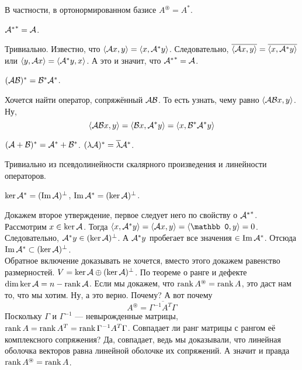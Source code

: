 \documentclass{article}
\DeclareMathOperator{\operIm}{Im}
\let\Im\operIm
\begin{document}
\begin{itemize}
\begin{Comment}
            В частности, в ортонормированном базисе $A^\circledast=A^*$.
        \end{Comment}
        \thm ${{\mathcal{A}}^*}^*={\mathcal{A}}$.
        \begin{Proof}
            Тривиально. Известно, что ${\left\langle{{\mathcal{A}}x},{y}\right\rangle}={\left\langle{x},{{\mathcal{A}}^*y}\right\rangle}$. Следовательно, $\overline{{\left\langle{{\mathcal{A}}x},{y}\right\rangle}}=\overline{{\left\langle{x},{{\mathcal{A}}^*y}\right\rangle}}$ или ${\left\langle{y},{{\mathcal{A}} x}\right\rangle}={\left\langle{{\mathcal{A}}^*y},{x}\right\rangle}$. А это и значит, что ${{\mathcal{A}}^*}^*={\mathcal{A}}$.
        \end{Proof}
        \thm $({\mathcal{A}}{\mathcal{B}})^*={\mathcal{B}}^*{\mathcal{A}}^*$.
        \begin{Proof}
            Хочется найти оператор, сопряжённый ${\mathcal{A}}{\mathcal{B}}$. То есть узнать, чему равно ${\left\langle{{\mathcal{A}}{\mathcal{B}}x},{y}\right\rangle}$. Ну,
            $${\left\langle{{\mathcal{A}}{\mathcal{B}}x},{y}\right\rangle}={\left\langle{{\mathcal{B}}x},{{\mathcal{A}}^*y}\right\rangle}={\left\langle{x},{{\mathcal{B}}^*{\mathcal{A}}^*y}\right\rangle}$$
        \end{Proof}
        \thm $({\mathcal{A}}+{\mathcal{B}})^*={\mathcal{A}}^*+{\mathcal{B}}^*$.
        \thm $(\lambda{\mathcal{A}})^*=\overline\lambda{\mathcal{A}}^*$.
        \begin{Proof}
            Тривиально из псевдолинейности скалярного произведения и линейности операторов.
        \end{Proof}
        \thm $\ker\scriptA^*=(\Im\scriptA)^\perp$, $\Im\scriptA^*=(\ker\scriptA)^\perp$.
        \begin{Proof}
            Докажем второе утверждение, первое следует него по свойству о ${{\mathcal{A}}^*}^*$.\\
            Рассмотрим $x\in\ker{\mathcal{A}}$. Тогда $\dotprod{x}{\scriptA^*y}=\dotprod{\scriptA x}{y}=\dotprod{\mathbb0}{y}=0$. Следовательно, ${\mathcal{A}}^*y\in(\ker{\mathcal{A}})^\perp$. А ${\mathcal{A}}^*y$ пробегает все значения $\in\Im\scriptA^*$. Отсюда $\Im\scriptA^*\subset(\ker\scriptA)^\perp$.\\
            Обратное включение доказывать не хочется, вместо этого докажем равенство размерностей. $V=\ker{\mathcal{A}}\oplus(\ker{\mathcal{A}})^\perp$. По теореме о ранге и дефекте $\dim\ker{\mathcal{A}}=n-\operatorname{rank}{\mathcal{A}}$. Если мы докажем, что $\operatorname{rank} A^\circledast=\operatorname{rank} A$, это даст нам то, что мы хотим. Ну, а это верно. Почему? А вот почему
            $$
            A^\circledast=\overline{\Gamma^{-1}A^T\Gamma}
            $$
            Поскольку $\Gamma$ и $\Gamma^{-1}$ --- невырожденные матрицы, $\operatorname{rank} A=\operatorname{rank} A^T=\operatorname{rank}\Gamma^{-1}A^T\Gamma$. Совпадает ли ранг матрицы с рангом её комплексного сопряжения? Да, совпадает, ведь мы доказывали, что линейная оболочка векторов равна линейной оболочке их сопряжений. А значит и правда $\operatorname{rank} A^\circledast=\operatorname{rank} A$.

\end{Proof}
\end{itemize}
\end{document}
